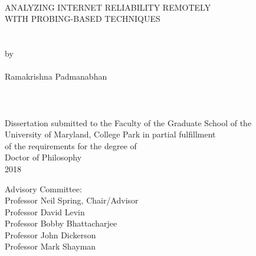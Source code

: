 \thispagestyle{empty}
\hbox{\ }
\vspace{1in}
\renewcommand{\baselinestretch}{1}
\small\normalsize
\begin{center}

\large{{ANALYZING INTERNET RELIABILITY REMOTELY \\
WITH PROBING-BASED TECHNIQUES}}\\
\ \\
\ \\
\large{by} \\
\ \\
\large{Ramakrishna Padmanabhan}%
\ \\
\ \\
\ \\
\ \\
\normalsize
Dissertation submitted to the Faculty of the Graduate School of the \\
University of Maryland, College Park in partial fulfillment \\
of the requirements for the degree of \\
Doctor of Philosophy \\
2018
\end{center}

\vspace{7.5em}

\noindent Advisory Committee: \\
Professor Neil Spring, Chair/Advisor \\
Professor David Levin \\
Professor Bobby Bhattacharjee\\
Professor  John Dickerson \\
Professor Mark Shayman \\
